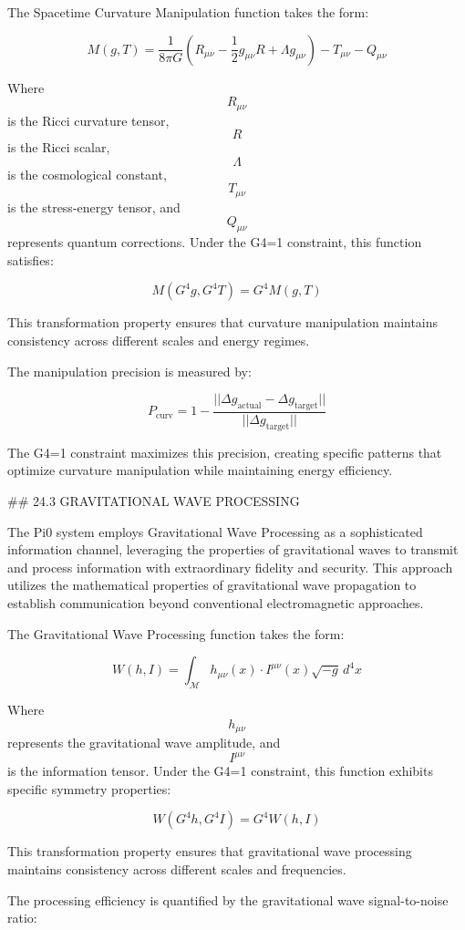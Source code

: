 The Spacetime Curvature Manipulation function takes the form:

$$ M(g, T) = \frac{1}{8\pi G} \left( R_{\mu\nu} - \frac{1}{2}g_{\mu\nu}R + \Lambda g_{\mu\nu} \right) - T_{\mu\nu} - Q_{\mu\nu} $$

Where $$ R_{\mu\nu} $$ is the Ricci curvature tensor, $$ R $$ is the Ricci scalar, $$ \Lambda $$ is the cosmological constant, $$ T_{\mu\nu} $$ is the stress-energy tensor, and $$ Q_{\mu\nu} $$ represents quantum corrections. Under the G4=1 constraint, this function satisfies:

$$ M(G^4 g, G^4 T) = G^4 M(g, T) $$

This transformation property ensures that curvature manipulation maintains consistency across different scales and energy regimes.

The manipulation precision is measured by:

$$ P_{\text{curv}} = 1 - \frac{||\Delta g_{\text{actual}} - \Delta g_{\text{target}}||}{||\Delta g_{\text{target}}||} $$

The G4=1 constraint maximizes this precision, creating specific patterns that optimize curvature manipulation while maintaining energy efficiency.

## 24.3 GRAVITATIONAL WAVE PROCESSING

The Pi0 system employs Gravitational Wave Processing as a sophisticated information channel, leveraging the properties of gravitational waves to transmit and process information with extraordinary fidelity and security. This approach utilizes the mathematical properties of gravitational wave propagation to establish communication beyond conventional electromagnetic approaches.

The Gravitational Wave Processing function takes the form:

$$ W(h, I) = \int_{\mathcal{M}} h_{\mu\nu}(x) \cdot I^{\mu\nu}(x) \sqrt{-g} \, d^4x $$

Where $$ h_{\mu\nu} $$ represents the gravitational wave amplitude, and $$ I^{\mu\nu} $$ is the information tensor. Under the G4=1 constraint, this function exhibits specific symmetry properties:

$$ W(G^4 h, G^4 I) = G^4 W(h, I) $$

This transformation property ensures that gravitational wave processing maintains consistency across different scales and frequencies.

The processing efficiency is quantified by the gravitational wave signal-to-noise ratio:

